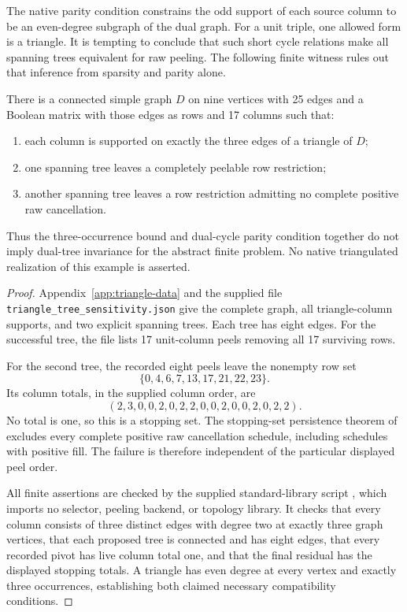 The native parity condition constrains the odd support of each source
column to be an even-degree subgraph of the dual graph.  For a unit
triple, one allowed form is a triangle.  It is tempting to conclude that
such short cycle relations make all spanning trees equivalent for raw
peeling.  The following finite witness rules out that inference from
sparsity and parity alone.

\begin{proposition}
\label{prop:exceptional-triangle-witness}
There is a connected simple graph $D$ on nine vertices with 25 edges and
a Boolean matrix with those edges as rows and 17 columns such that:
\begin{enumerate}
\item each column is supported on exactly the three edges of a triangle
      of $D$;
\item one spanning tree leaves a completely peelable row restriction;
\item another spanning tree leaves a row restriction admitting no
      complete positive raw cancellation.
\end{enumerate}
Thus the three-occurrence bound and dual-cycle parity condition together
do not imply dual-tree invariance for the abstract finite problem.
No native triangulated realization of this example is asserted.
\end{proposition}

\begin{proof}
Appendix~\ref{app:triangle-data} and the supplied file
\texttt{triangle\_tree\_sensitivity.json} give the
complete graph, all triangle-column supports, and two explicit spanning
trees.  Each tree has eight edges.  For the successful tree, the file
lists 17 unit-column peels removing all 17 surviving rows.

For the second tree, the recorded eight peels leave the nonempty row set
\[
                         \{0,4,6,7,13,17,21,22,23\}.
\]
Its column totals, in the supplied column order, are
\[
             (2,3,0,0,2,0,2,2,0,0,2,0,0,2,0,2,2).
\]
No total is one, so this is a stopping set.  The stopping-set persistence
theorem of \cite{IncomingDualNormalization} excludes every complete
positive raw cancellation schedule, including schedules with positive
fill.  The failure is therefore independent of the particular displayed
peel order.

All finite assertions are checked by the supplied standard-library
script , which imports no selector,
peeling backend, or topology library.  It checks that every column
consists of three distinct edges with degree two at exactly three graph
vertices, that each proposed tree is connected and has eight edges,
that every recorded pivot has live column total one, and that the final
residual has the displayed stopping totals.  A triangle has even degree
at every vertex and exactly three occurrences, establishing both claimed
necessary compatibility conditions.
\end{proof}

